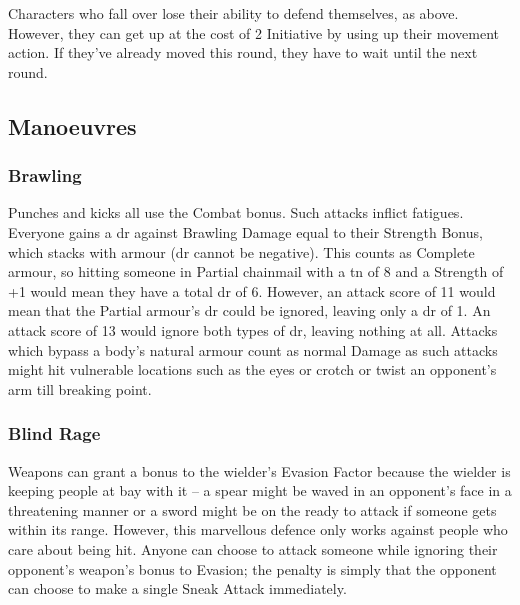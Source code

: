 \begin{multicols}{2}
Characters who fall over lose their ability to defend themselves, as above.
However, they can get up at the cost of 2 Initiative by using up their movement action.
If they've already moved this \gls{round}, they have to wait until the next \gls{round}.

\subsection{Manoeuvres}

\subsubsection[Brawling: Make a normal attack roll, but any attack with a Margin less than 5 only inflicts \glspl{fatigue} rather than Damage]{Brawling}

Punches and kicks all use the Combat bonus. Such attacks inflict \glspl{fatigue}. Everyone gains a \gls{dr} against Brawling Damage equal to their Strength Bonus, which stacks with armour (\gls{dr} cannot be negative). This counts as Complete armour, so hitting someone in Partial chainmail with a \gls{tn} of 8 and a Strength of +1 would mean they have a total \gls{dr} of 6. However, an attack score of 11 would mean that the Partial armour's \gls{dr} could be ignored, leaving only a \gls{dr} of 1. An attack score of 13 would ignore both types of \gls{dr}, leaving nothing at all. Attacks which bypass a body's natural armour count as normal Damage as such attacks might hit vulnerable locations such as the eyes or crotch or twist an opponent's arm till breaking point.

\subsubsection[Blind Rage: You can mitigate an enemy's weapon bonus to Evasion, but they can make an attack against you as a Quick Action]{Blind Rage}\label{blindrage}

Weapons can grant a bonus to the wielder's Evasion Factor because the wielder is keeping people at bay with it -- a spear might be waved in an opponent's face in a threatening manner or a sword might be on the ready to attack if someone gets within its range.
However, this marvellous defence only works against people who care about being hit.
Anyone can choose to attack someone while ignoring their opponent's weapon's bonus to Evasion; the penalty is simply that the opponent can choose to make a single Sneak Attack immediately.


\end{multicols}
